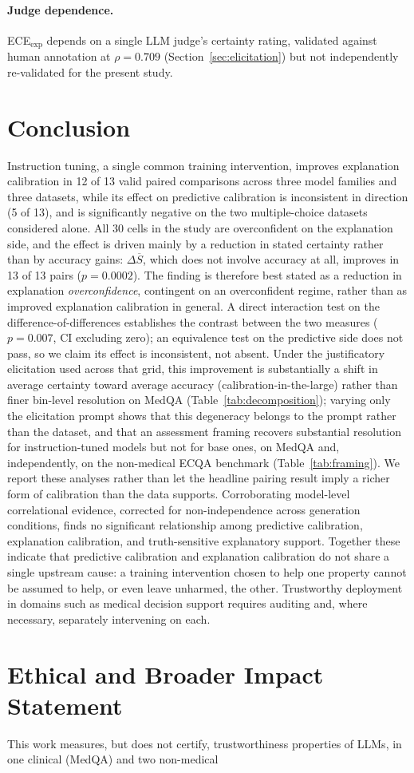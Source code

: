 \documentclass[letterpaper]{article} %
\begin{document}
\paragraph{Judge dependence.} ECE$_{\text{exp}}$ depends on a single LLM judge's certainty rating, validated against human annotation at $\rho{=}0.709$ (Section~\ref{sec:elicitation}) but not independently re-validated for the present study. \section{Conclusion} Instruction tuning, a single common training intervention, improves explanation calibration in 12 of 13 valid paired comparisons across three model families and three datasets, while its effect on predictive calibration is inconsistent in direction (5 of 13), and is significantly negative on the two multiple-choice datasets considered alone. All 30 cells in the study are overconfident on the explanation side, and the effect is driven mainly by a reduction in stated certainty rather than by accuracy gains: $\Delta\overline{S}$, which does not involve accuracy at all, improves in 13 of 13 pairs ($p{=}0.0002$). The finding is therefore best stated as a reduction in explanation \emph{overconfidence}, contingent on an overconfident regime, rather than as improved explanation calibration in general. A direct interaction test on the difference-of-differences establishes the contrast between the two measures ($p{=}0.007$, CI excluding zero); an equivalence test on the predictive side does not pass, so we claim its effect is inconsistent, not absent. Under the justificatory elicitation used across that grid, this improvement is substantially a shift in average certainty toward average accuracy (calibration-in-the-large) rather than finer bin-level resolution on MedQA (Table~\ref{tab:decomposition}); varying only the elicitation prompt shows that this degeneracy belongs to the prompt rather than the dataset, and that an assessment framing recovers substantial resolution for instruction-tuned models but not for base ones, on MedQA and, independently, on the non-medical ECQA benchmark (Table~\ref{tab:framing}). We report these analyses rather than let the headline pairing result imply a richer form of calibration than the data supports. Corroborating model-level correlational evidence, corrected for non-independence across generation conditions, finds no significant relationship among predictive calibration, explanation calibration, and truth-sensitive explanatory support. Together these indicate that predictive calibration and explanation calibration do not share a single upstream cause: a training intervention chosen to help one property cannot be assumed to help, or even leave unharmed, the other. Trustworthy deployment in domains such as medical decision support requires auditing and, where necessary, separately intervening on each. \section*{Ethical and Broader Impact Statement} This work measures, but does not certify, trustworthiness properties of LLMs, in one clinical (MedQA) and two non-medical 
\end{document}
